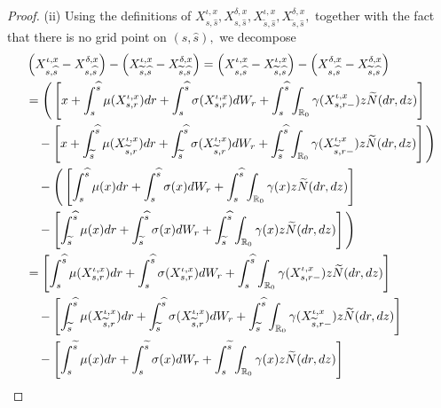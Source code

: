 \documentclass[10pt,a4paper]{amsart}
\newcommand{\bR}{\mathbb{R}}
\begin{document}
\begin{proof}
(ii) Using the definitions of $X^{\iota, x}_{s,\widehat{s}}, X^{\delta,x}_{s,\widehat{s}}, X^{\iota, x}_{\widetilde{s},\widehat{s}}, X^{\delta, x}_{\widetilde{s},\widehat{s}},$ together with the fact that there is no grid point on $(s, \widehat{s}),$ we decompose
\begin{align*}
 & \left(X^{\iota, x}_{s,\widehat{s}}-X^{\delta,x}_{s,\widehat{s}}\right) - \left(X^{\iota, x}_{\widetilde{s},\widehat{s}}-X^{\delta, x}_{\widetilde{s},\widehat{s}}\right) = \left(X^{\iota, x}_{s,\widehat{s}}-X^{\iota, x}_{\widetilde{s},\widehat{s}} \right) - \left(X^{\delta,x}_{s,\widehat{s}}-X^{\delta, x}_{\widetilde{s},\widehat{s}}\right) \notag\\
 & = \Bigg( \left[x+\int_s^{\widehat{s}} \mu(X_{s, r}^{\iota, x}) dr + \int_s^{\widehat{s}} \sigma(X_{s, r}^{\iota, x}) dW_r+ \int_s^{\widehat{s}} \int_{\bR_0} \gamma (X_{s, r-}^{\iota, x}) z \widetilde{N}(dr, dz) \right] \notag \\
 & \quad  -  \left[x+\int_{\widetilde{s}}^{\widehat{s}} \mu(X_{\widetilde{s}, r}^{\iota, x}) dr + \int_{\widetilde{s}}^{\widehat{s}} \sigma(X_{\widetilde{s}, r}^{\iota, x}) dW_r+ \int_{\widetilde{s}}^{\widehat{s}} \int_{\bR_0} \gamma (X_{\widetilde{s}, r-}^{\iota, x}) z \widetilde{N}(dr, dz) \right]\Bigg ) \notag \\
  & \quad - \Bigg( \left[\int_s^{\widehat{s}} \mu(x) dr + \int_s^{\widehat{s}} \sigma(x) dW_r+ \int_s^{\widehat{s}} \int_{\bR_0} \gamma(x) z \widetilde{N}(dr, dz) \right] \notag \\
    & \quad  -  \left[\int_{\widetilde{s}}^{\widehat{s}} \mu(x) dr + \int_{\widetilde{s}}^{\widehat{s}} \sigma(x) dW_r+ \int_{\widetilde{s}}^{\widehat{s}} \int_{\bR_0} \gamma(x) z \widetilde{N}(dr, dz) \right] \Bigg)  \notag \\
 & = \left[\int_s^{\widehat{s}} \mu(X_{s, r}^{\iota, x}) dr + \int_s^{\widehat{s}} \sigma(X_{s, r}^{\iota, x}) dW_r+ \int_s^{\widehat{s}} \int_{\bR_0} \gamma (X_{s, r-}^{\iota, x}) z \widetilde{N}(dr, dz) \right] \notag \\
 & \quad -  \left[\int_{\widetilde{s}}^{\widehat{s}} \mu(X_{\widetilde{s}, r}^{\iota, x}) dr + \int_{\widetilde{s}}^{\widehat{s}} \sigma(X_{\widetilde{s}, r}^{\iota, x}) dW_r+ \int_{\widetilde{s}}^{\widehat{s}} \int_{\bR_0} \gamma (X_{\widetilde{s}, r-}^{\iota, x}) z \widetilde{N}(dr, dz) \right] \notag \\
    & \quad -  \left[\int_{s}^{\widetilde{s}} \mu(x) dr + \int_{s}^{\widetilde{s}} \sigma(x) dW_r+ \int_{s}^{\widetilde{s}} \int_{\bR_0} \gamma(x) z \widetilde{N}(dr, dz) \right]  \notag \\

\end{align*}
\end{proof}
\end{document}
